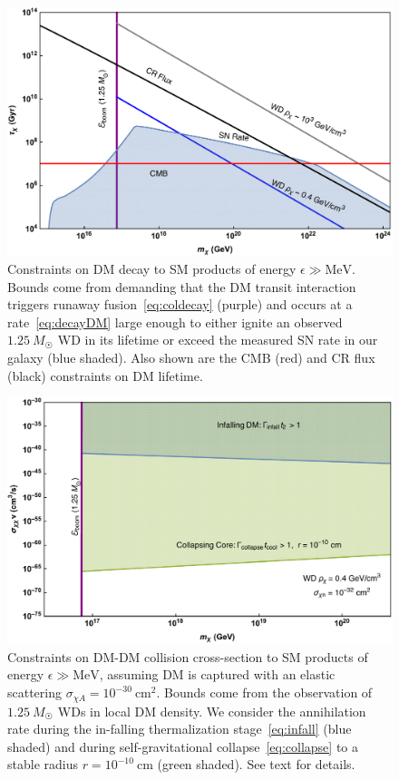 \documentclass[preprintnumbers,amsmath,amssymb,prd,superscriptaddress]{revtex4}
\newcommand{\MeV}{\text{MeV}}
\newcommand{\cm}{\text{cm}}
\begin{document}
\begin{figure}
\includegraphics[scale=.45]{decayobservation.pdf}
\caption{Constraints on DM decay to SM products of energy $\epsilon \gg \MeV$.
Bounds come from demanding that the DM transit interaction triggers runaway fusion~\eqref{eq:coldecay} (purple) and occurs at a rate~\eqref{eq:decayDM} large enough to either ignite an observed $1.25~M_{\astrosun}$ WD in its lifetime or exceed the measured SN rate in our galaxy (blue shaded).
Also shown are the CMB \cite{Slatyer:2016qyl} (red) and CR flux (black) constraints on DM lifetime.}
\label{fig:transit-decay}
\end{figure}

\begin{figure}
\includegraphics[scale=.45]{capturecollision.pdf}
\caption{Constraints on DM-DM collision cross-section to SM products of energy $\epsilon \gg \MeV$, assuming DM is captured with an elastic scattering $\sigma_{\chi A} = 10^{-30} ~\cm^2$.
Bounds come from the observation of $1.25~M_{\astrosun}$ WDs in local DM density.
We consider the annihilation rate during the in-falling thermalization stage~\eqref{eq:infall} (blue shaded) and during self-gravitational collapse~\eqref{eq:collapse} to a stable radius $r = 10^{-10} ~\cm$ (green shaded). See text for details.
}
\label{fig:capture-collision}
\end{figure}
\end{document}
